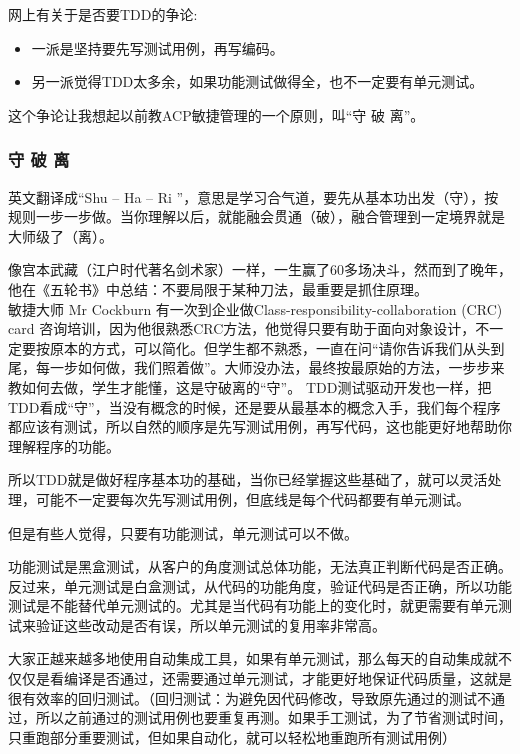 网上有关于是否要TDD的争论:

\begin{itemize}
\tightlist
\item
  一派是坚持要先写测试用例，再写编码。
\item
  另一派觉得TDD太多余，如果功能测试做得全，也不一定要有单元测试。
\end{itemize}

这个争论让我想起以前教ACP敏捷管理的一个原则，叫``守 破 离''。

\hypertarget{ux5b88-ux7834-ux79bb}{%
\subsubsection{守 破 离}\label{ux5b88-ux7834-ux79bb}}

英文翻译成“Shu – Ha – Ri ”，意思是学习合气道，要先从基本功出发（守），按规则一步一步做。当你理解以后，就能融会贯通（破），融合管理到一定境界就是大师级了（离）。

像宫本武藏（江户时代著名剑术家）一样，一生赢了60多场决斗，然而到了晚年，他在《五轮书》中总结：不要局限于某种刀法，最重要是抓住原理。\\

敏捷大师 Mr Cockburn 有一次到企业做Class-responsibility-collaboration (CRC) card 咨询培训，因为他很熟悉CRC方法，他觉得只要有助于面向对象设计，不一定要按原本的方式，可以简化。但学生都不熟悉，一直在问“请你告诉我们从头到尾，每一步如何做，我们照着做”。大师没办法，最终按最原始的方法，一步步来教如何去做，学生才能懂，这是守破离的“守”。
TDD测试驱动开发也一样，把TDD看成``守''，当没有概念的时候，还是要从最基本的概念入手，我们每个程序都应该有测试，所以自然的顺序是先写测试用例，再写代码，这也能更好地帮助你理解程序的功能。

所以TDD就是做好程序基本功的基础，当你已经掌握这些基础了，就可以灵活处理，可能不一定要每次先写测试用例，但底线是每个代码都要有单元测试。

但是有些人觉得，只要有功能测试，单元测试可以不做。

功能测试是黑盒测试，从客户的角度测试总体功能，无法真正判断代码是否正确。反过来，单元测试是白盒测试，从代码的功能角度，验证代码是否正确，所以功能测试是不能替代单元测试的。尤其是当代码有功能上的变化时，就更需要有单元测试来验证这些改动是否有误，所以单元测试的复用率非常高。

大家正越来越多地使用自动集成工具，如果有单元测试，那么每天的自动集成就不仅仅是看编译是否通过，还需要通过单元测试，才能更好地保证代码质量，这就是很有效率的回归测试。（回归测试：为避免因代码修改，导致原先通过的测试不通过，所以之前通过的测试用例也要重复再测。如果手工测试，为了节省测试时间，只重跑部分重要测试，但如果自动化，就可以轻松地重跑所有测试用例）

